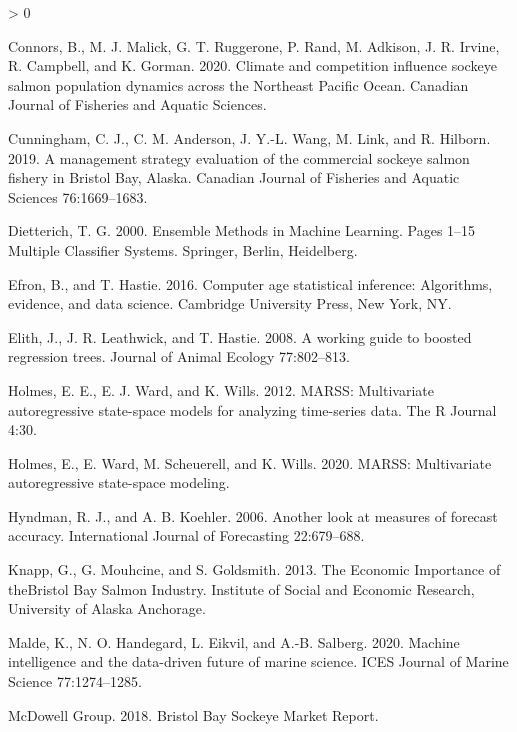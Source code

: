 \documentclass[
]{article}
\newlength{\cslhangindent}
\newenvironment{CSLReferences}[2] %
 {%
  \setlength{\parindent}{0pt}
  \ifodd #1 \everypar{\setlength{\hangindent}{\cslhangindent}}\ignorespaces\fi
  \ifnum #2 > 0
  \setlength{\parskip}{#2\baselineskip}
  \fi
 }%
 {}
\begin{document}
\begin{CSLReferences}{1}{0}
\leavevmode\hypertarget{ref-connors2020}{}%
Connors, B., M. J. Malick, G. T. Ruggerone, P. Rand, M. Adkison, J. R. Irvine, R. Campbell, and K. Gorman. 2020. Climate and competition influence sockeye salmon population dynamics across the {Northeast Pacific Ocean}. Canadian Journal of Fisheries and Aquatic Sciences.

\leavevmode\hypertarget{ref-cunningham2019}{}%
Cunningham, C. J., C. M. Anderson, J. Y.-L. Wang, M. Link, and R. Hilborn. 2019. A management strategy evaluation of the commercial sockeye salmon fishery in {Bristol Bay}, {Alaska}. Canadian Journal of Fisheries and Aquatic Sciences 76:1669--1683.

\leavevmode\hypertarget{ref-Dietterich2000}{}%
Dietterich, T. G. 2000. Ensemble {Methods} in {Machine Learning}. Pages 1--15 Multiple {Classifier Systems}. {Springer, Berlin, Heidelberg}.

\leavevmode\hypertarget{ref-efron2016}{}%
Efron, B., and T. Hastie. 2016. Computer age statistical inference: Algorithms, evidence, and data science. {Cambridge University Press}, {New York, NY}.

\leavevmode\hypertarget{ref-elith2008}{}%
Elith, J., J. R. Leathwick, and T. Hastie. 2008. A working guide to boosted regression trees. Journal of Animal Ecology 77:802--813.

\leavevmode\hypertarget{ref-holmes2012}{}%
Holmes, E. E., E. J. Ward, and K. Wills. 2012. MARSS: Multivariate autoregressive state-space models for analyzing time-series data. The R Journal 4:30.

\leavevmode\hypertarget{ref-holmes2020}{}%
Holmes, E., E. Ward, M. Scheuerell, and K. Wills. 2020. MARSS: Multivariate autoregressive state-space modeling.

\leavevmode\hypertarget{ref-hyndman2006}{}%
Hyndman, R. J., and A. B. Koehler. 2006. Another look at measures of forecast accuracy. International Journal of Forecasting 22:679--688.

\leavevmode\hypertarget{ref-knapp2013}{}%
Knapp, G., G. Mouhcine, and S. Goldsmith. 2013. The {Economic Importance} of {theBristol Bay Salmon Industry}. {Institute of Social and Economic Research}, {University of Alaska Anchorage}.

\leavevmode\hypertarget{ref-malde2020}{}%
Malde, K., N. O. Handegard, L. Eikvil, and A.-B. Salberg. 2020. Machine intelligence and the data-driven future of marine science. ICES Journal of Marine Science 77:1274--1285.

\leavevmode\hypertarget{ref-mcdowellgroup2018}{}%
McDowell Group. 2018. Bristol {Bay Sockeye Market Report}.


\end{CSLReferences}
\end{document}
